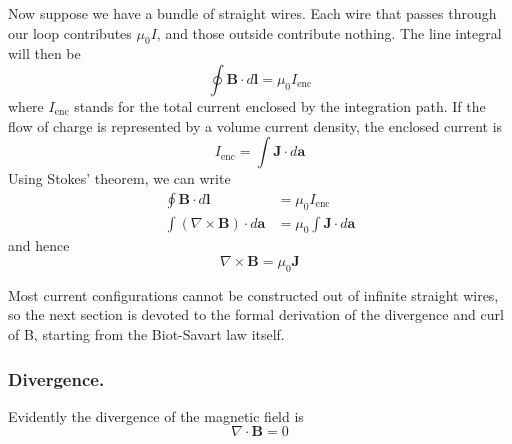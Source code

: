 \documentclass[../../../main.tex]{subfiles}
\begin{document}
Now suppose we have a bundle of straight wires. Each wire that passes through our loop contributes $\mu_0 I$, and those outside contribute nothing. The line integral will then be
\begin{equation*}
    \oint \mathbf{B}\cdot d\mathbf{l}=\mu_0I_{\text{enc}}
\end{equation*}
where $I_{\text{enc}}$ stands for the total current enclosed by the integration path. If the ﬂow 
of charge is represented by a volume current density, the enclosed current is
\begin{equation*}
    I_{\text{enc}}=\int \mathbf{J}\cdot d\mathbf{a}
\end{equation*}
Using Stokes' theorem, we can write 
\begin{align*}
    \oint \mathbf{B}\cdot d\mathbf{l}&=\mu_0I_{\text{enc}}\\
    \int(\nabla \times \mathbf{B})\cdot d\mathbf{a}&=\mu_0\int \mathbf{J}\cdot d\mathbf{a}
\end{align*}
and hence
\begin{equation*}
    \nabla \times \mathbf{B}=\mu_0\mathbf{J} 
\end{equation*}

Most current conﬁgurations cannot be constructed out of inﬁnite straight wires, so the next section is devoted to the formal derivation of the divergence and curl of B, starting from the Biot-Savart law itself.

\subsubsection*{Divergence.} Evidently the divergence of the magnetic ﬁeld is
\begin{equation*}
    \nabla \cdot \mathbf{B}=0
\end{equation*}
\end{document}
